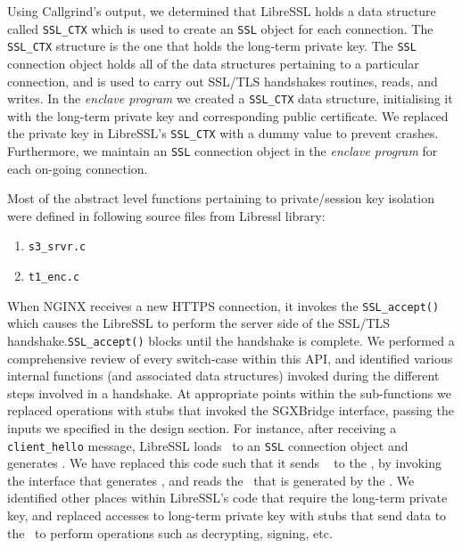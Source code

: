 \documentclass[../main.tex]{subfiles}
\begin{document}
Using Callgrind's output, we determined that LibreSSL holds a data
structure called \texttt{SSL\_CTX} which is used to create an
\texttt{SSL} object for each connection. The \texttt{SSL\_CTX}
structure is the one that holds the long-term private key. The
\texttt{SSL} connection object holds all of the data structures
pertaining to a particular connection, and is used to carry out
SSL/TLS handshakes routines, reads, and writes. In the \textit{enclave
  program} we created a \texttt{SSL\_CTX} data structure, initialising
it with the long-term private key and corresponding public
certificate. We replaced the private key in LibreSSL's
\texttt{SSL\_CTX} with a dummy value to prevent crashes. Furthermore,
we maintain an \texttt{SSL} connection object in the \textit{enclave
  program} for each on-going connection.
 
Most of the abstract level functions pertaining to private/session key
isolation were defined in following source files from Libressl
library:
\begin{enumerate}
  \item \texttt{s3\_srvr.c}
  \item \texttt{t1\_enc.c}
\end{enumerate}
 
When NGINX receives a new HTTPS connection, it invokes the
\texttt{SSL\_accept()} which causes the LibreSSL to perform the server
side of the SSL/TLS handshake.\texttt{SSL\_accept()} blocks until the
handshake is complete. We performed a comprehensive review of every
switch-case within this API, and identified various internal functions
(and associated data structures) invoked during the different steps
involved in a handshake. At appropriate points within the
sub-functions we replaced operations with stubs that invoked the
SGXBridge interface, passing the inputs we specified in the design
section. For instance, after receiving a \texttt{client\_hello}
message, LibreSSL loads \crandom~to an \texttt{SSL} connection object
and generates \srandom. We have replaced this code such that it sends
\crandom~ to the \enclaveprogram, by invoking the interface that
generates \srandom, and reads the \srandom~that is generated by the
\enclaveprogram. We identified other places within LibreSSL's code
that require the long-term private key, and replaced accesses to
long-term private key with stubs that send data to the
\enclaveprogram~to perform operations such as decrypting, signing,
etc.
\end{document}
